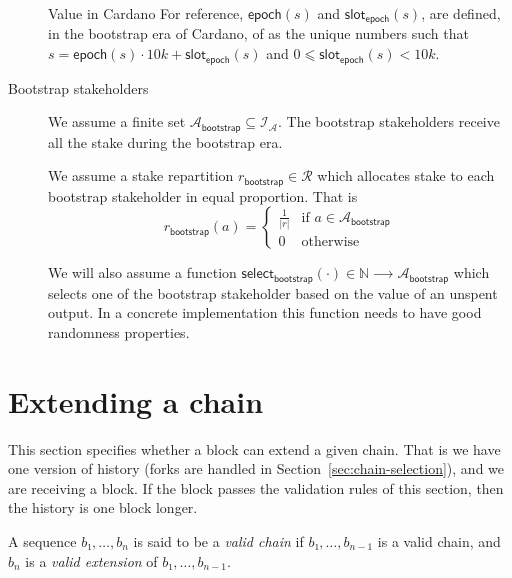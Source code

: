 \documentclass{article}
\newenvironment{currentvalue}{\begin{bclogo}[noborder=true,
    logo=\bcinfo, epBarre=3, couleurBarre=YellowOrange]{Value in Cardano}}{\end{bclogo}}
\newcommand{\supportsize}[1]{|#1|}
\newcommand{\idsof}[1]{\mathcal{I}\!_#1}
\newcommand{\agentids}{\idsof{\mathcal{A}}}
\newcommand{\bootstrapstakeholders}{\mathcal{A}_{\mathsf{bootstrap}}}
\newcommand{\epoch}[1]{\mathsf{epoch}(#1)}
\newcommand{\epochslot}[1]{\mathsf{slot}_\mathsf{epoch}(#1)}
\newcommand{\selectrichman}[1]{\mathsf{select}_\mathsf{bootstrap}(#1)}
\newcommand{\stakerepartitions}{\mathcal{R}}
\newcommand{\bootstraprepartition}{r_\mathsf{bootstrap}}
\begin{document}
\begin{description}
  \begin{currentvalue}
    For reference, $\epoch{s}$ and $\epochslot{s}$, are defined, in
    the bootstrap era of Cardano, of as the unique numbers such that
    $s=\epoch{s}\cdot 10k+\epochslot{s}$ and $0⩽ \epochslot{s} < 10k$.
  \end{currentvalue}


\item[Bootstrap stakeholders] We assume a finite set
  $\bootstrapstakeholders ⊆ \agentids$. The bootstrap stakeholders receive all the
  stake during the bootstrap era.

  We assume a stake repartition
  $\bootstraprepartition ∈ \stakerepartitions$ which allocates stake
  to each bootstrap stakeholder in equal proportion. That is
  $$
  \bootstraprepartition(a) = \left\{
    \begin{array}{cl}
      \displaystyle{\frac{1}{\supportsize{r}}}& \mbox{if $a∈\bootstrapstakeholders$}\\
      0 & \mbox{otherwise}
    \end{array}\right.
  $$

  We will also assume a function $\selectrichman{⋅} ∈ ℕ ⟶ \bootstrapstakeholders$
  which selects one of the bootstrap stakeholder based on the value of an unspent
  output. In a concrete implementation this function needs to have
  good randomness properties.

\end{description}
\section{Extending a chain}
\label{sec:adding-block}

This section specifies whether a block can extend a given chain. That
is we have one version of history (forks are handled in
Section~\ref{sec:chain-selection}), and we are receiving a block. If
the block passes the validation rules of this section, then the
history is one block longer.

A sequence $b₁,…,b_n$ is said to be a \emph{valid chain} if
$b₁,…,b_{n-1}$ is a valid chain,
and $b_n$ is a \emph{valid extension} of $b₁,…,b_{n-1}$.
\end{document}
